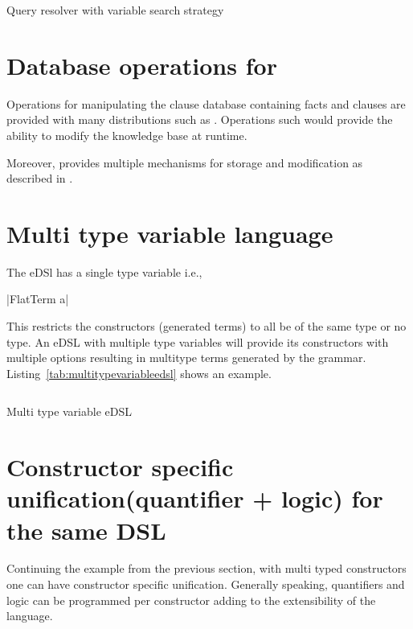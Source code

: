 \documentclass[thesis-solanki.tex]{subfiles}
\begin{document}
\begin{code-list}[H]
\begin{singlespace}
\inputminted{haskell}{haskell-proto4-query-resolver-variable-search-strat.hs}
\end{singlespace}
\caption{Query resolver with variable search strategy}
\label{tab:queryresolvervariablesearchstrat}
\end{code-list}  

\section{Database operations for }
Operations for manipulating the clause database containing facts and clauses are provided with many  distributions such as
 \cite{website:swiprologdbops}. Operations such  \cite{website:assertzswiprolog} would provide
the ability to modify the knowledge base at runtime. 

Moreover,  provides multiple mechanisms for storage and modification as described in \cite{website:swiprologdbops}.

\section{Multi type variable language}
The eDSl  has a single type variable i.e.,

|FlatTerm a|

This restricts the constructors (generated terms) to all be of the same type or no type. An eDSL with multiple type variables will provide
its constructors with multiple options resulting in multitype terms generated by the grammar. Listing~\ref{tab:multitypevariableedsl} shows 
an example.

\begin{code-list}[H]
\begin{singlespace}
\inputminted{haskell}{haskell-proto4-multi-type-variable-edsl.hs}
\end{singlespace}
\caption{Multi type variable eDSL}
\label{tab:multitypevariableedsl}
\end{code-list}

\section{Constructor specific unification(quantifier + logic) for the same DSL}
Continuing the example from the previous section, with multi typed constructors one can have constructor specific unification. Generally 
speaking, quantifiers and logic can be programmed per constructor adding to the extensibility of the language.   
\end{document}
